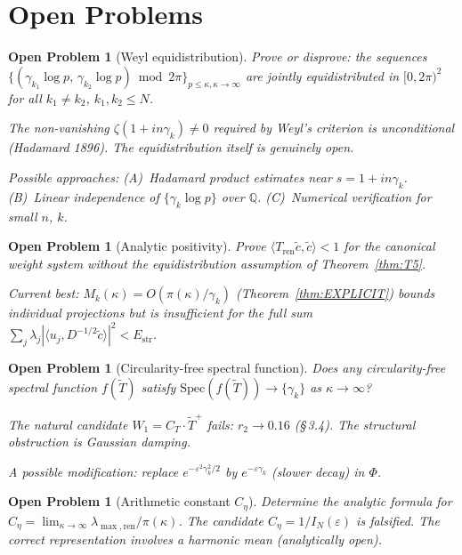 \documentclass[11pt]{article}
\newtheorem{openproblem}[theorem]{Open Problem}
\newcommand{\Estr}{E_{\mathrm{str}}}
\newcommand{\Tren}{T_{\mathrm{ren}}}
\newcommand{\Tt}{\widetilde{T}}
\newcommand{\Ceta}{C_{\eta}}
\newcommand{\CT}{C_{T}}
\newcommand{\Wone}{W_1}
\begin{document}
\section{Open Problems}

\begin{openproblem}[Weyl equidistribution]\label{op:weyl}
Prove or disprove: the sequences
$\{(\gamma_{k_1}\log p,\,\gamma_{k_2}\log p)\bmod 2\pi\}_{p\leq\kappa,
\kappa\to\infty}$
are jointly equidistributed in $[0,2\pi)^2$
for all $k_1\neq k_2$, $k_1,k_2\leq N$.

The non-vanishing $\zeta(1+in\gamma_k)\neq 0$ required by Weyl's
criterion is unconditional (Hadamard 1896). The equidistribution
itself is genuinely open.

Possible approaches:
(A)~Hadamard product estimates near $s = 1+in\gamma_k$.
(B)~Linear independence of $\{\gamma_k\log p\}$ over $\mathbb{Q}$.
(C)~Numerical verification for small $n$, $k$.
\end{openproblem}

\begin{openproblem}[Analytic positivity]\label{op:pos}
Prove $\langle\Tren\tilde{c},\tilde{c}\rangle < 1$ for the canonical
weight system without the equidistribution assumption of
Theorem~\ref{thm:T5}.

Current best: $M_k(\kappa) = O(\pi(\kappa)/\gamma_k)$
(Theorem~\ref{thm:EXPLICIT}) bounds individual projections but is
insufficient for the full sum
$\sum_j\lambda_j|\langle u_j, D^{-1/2}\tilde{c}\rangle|^2 < \Estr$.
\end{openproblem}

\begin{openproblem}[Circularity-free spectral function]\label{op:hp}
Does any circularity-free spectral function $f(\Tt)$ satisfy
$\mathrm{Spec}(f(\Tt))\to\{\gamma_k\}$ as $\kappa\to\infty$?

The natural candidate $\Wone = \CT\cdot\Tt^+$ fails: $r_2\to 0.16$
(\S\,3.4). The structural obstruction is Gaussian damping.

A possible modification: replace $e^{-\varepsilon^2\gamma_k^2/2}$
by $e^{-\varepsilon\gamma_k}$ (slower decay) in $\Phi$.
\end{openproblem}

\begin{openproblem}[Arithmetic constant $\Ceta$]\label{op:ceta}
Determine the analytic formula for
$\Ceta = \lim_{\kappa\to\infty}\lambda_{\max,\mathrm{ren}}/\pi(\kappa)$.
The candidate $\Ceta = 1/I_N(\varepsilon)$ is falsified.
The correct representation involves a harmonic mean
(analytically open).
\end{openproblem}
\end{document}
